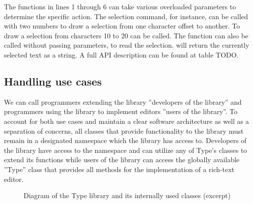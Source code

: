 \noindent The functions in lines 1 through 6 can take various overloaded parameters to determine the specific action. The selection command, for instance, can be called with two numbers to draw a selection from one character offset to another. To draw a selection from characters 10 to 20  can be called. The function can also be called without passing parameters, to read the selection.  will return the currently selected text as a string. A full API description can be found at table TODO.




\subsection{Handling use cases}
\label{subsec:api_design_handling_use_cases}

We can call programmers extending the library ''developers of the library'' and programmers using the library to implement editors ''users of the library''. To account for both use cases and maintain a clear software architecture as well as a separation of concerns, all classes that provide functionality to the library must remain in a designated namespace which the library has access to. Developers of the library have access to the namespace and can utilize any of Type's classes to extend its functions while users of the library can access the globally available ''Type'' class that provides all methods for the implementation of a rich-text editor.

\begin{figure}[!htb]
\centering
{}
\caption{Diagram of the Type library and its internally used classes (excerpt)}
\label{fig:type_uml_excerpt}
\end{figure}

